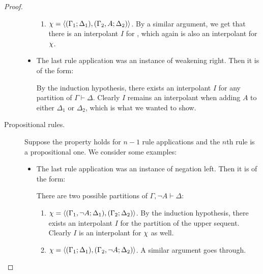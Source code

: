 \begin{proof}
\begin{description}
\begin{itemize}
\begin{enumerate}
							\item $\chi =  \langle (\Gamma_1; \Delta_1), (\Gamma_2, A; \Delta_2)\rangle $.
								By a similar argument, we get that there is an interpolant $I$ for 
, which again is also an interpolant for $\chi$.

					\end{enumerate}

				\item The last rule application was an instance of weakening right. Then it is of the form:
					\begin{prooftree}
						\Axiomm{\Gamma \fCenter \Delta}
					\end{prooftree}

					By the induction hypothesis, there exists an interpolant $I$ for any partition  of $\Gamma \vdash \Delta$.
					Clearly $I$ remains an interpolant when adding $A$ to either $\Delta_1$ or $\Delta_2$, which is what we wanted to show.

			\end{itemize}

		\item[\normalfont Propositional rules.]
			Suppose the property holds for $n-1$ rule applications and the $n$th rule is a propositional one.
			We consider some examples:

			\begin{itemize}
				\item The last rule application was an instance of negation left. Then it is of the form:
					\begin{prooftree}
						\Axiomm{\Gamma \fCenter \Delta,  A}
						\RightLabelm{\lkrule{\lnot}{l}}
						\UnaryInfm{\Gamma, \lnot A \fCenter \Delta }
					\end{prooftree}

					There are two possible partitions of $\Gamma, \lnot A \vdash \Delta$:
					\begin{enumerate}
						\item $\chi =  \langle (\Gamma_1, \lnot A; \Delta_1), (\Gamma_2; \Delta_2)\rangle $.
							By the induction hypothesis, there exists an interpolant $I$ for the partition  of the upper sequent.
							Clearly $I$ is an interpolant for $\chi$ as well.

						\item $\chi =  \langle (\Gamma_1; \Delta_1), (\Gamma_2, \lnot A; \Delta_2)\rangle $. A similar argument goes through. 
					\end{enumerate}


\end{itemize}
\end{description}
\end{proof}
